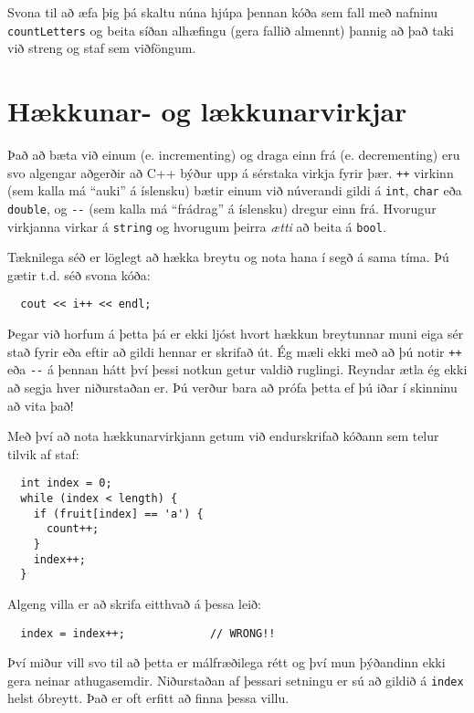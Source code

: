 
Svona til að æfa þig þá skaltu núna hjúpa þennan kóða sem fall með nafninu {\tt countLetters} og beita síðan alhæfingu (gera fallið almennt)
þannig að það taki við streng og staf sem viðföngum.



\section{Hækkunar- og lækkunarvirkjar}

Það að bæta við einum (e. incrementing) og draga einn frá (e. decrementing) eru svo algengar aðgerðir að C++ býður upp á sérstaka virkja fyrir þær.
{\tt ++} virkinn (sem kalla má ``auki'' á íslensku) bætir einum við núverandi gildi á {\tt int}, {\tt char} eða {\tt double}, og
\verb+--+ (sem kalla má ``frádrag'' á íslensku) dregur einn frá.
Hvorugur virkjanna virkar á {\tt string} og hvorugum þeirra {\em ætti} að beita á {\tt bool}.

Tæknilega séð er löglegt að hækka breytu og nota hana í segð á sama tíma.
Þú gætir t.d. séð svona kóða: 

\begin{verbatim}
  cout << i++ << endl;
\end{verbatim}
%
Þegar við horfum á þetta þá er ekki ljóst hvort hækkun breytunnar muni eiga sér stað fyrir eða eftir að gildi hennar er skrifað út.
Ég mæli ekki með að þú notir {\tt ++} eða \verb+--+ á þennan hátt því þessi notkun getur valdið ruglingi.
Reyndar ætla ég ekki að segja hver niðurstaðan er.  
Þú verður bara að prófa þetta ef þú iðar í skinninu að vita það!

Með því að nota hækkunarvirkjann getum við endurskrifað kóðann sem telur tilvik af staf:

\begin{verbatim}
  int index = 0;
  while (index < length) {
    if (fruit[index] == 'a') {
      count++;
    }
    index++;
  }
\end{verbatim}
%
Algeng villa er að skrifa eitthvað á þessa leið:

\begin{verbatim}
  index = index++;             // WRONG!!
\end{verbatim}
%
Því miður vill svo til að þetta er málfræðilega rétt og því mun þýðandinn ekki gera neinar athugasemdir.
Niðurstaðan af þessari setningu er sú að gildið á {\tt index} helst óbreytt.
Það er oft erfitt að finna þessa villu.

